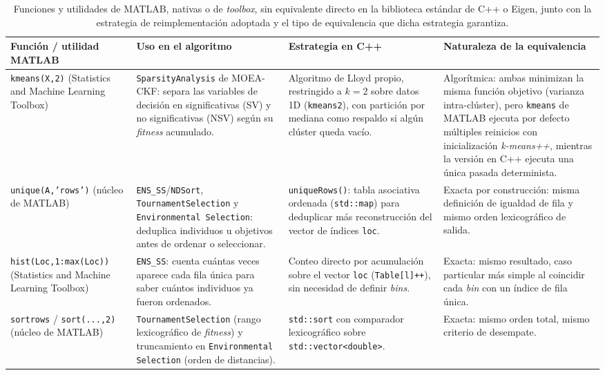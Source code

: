 \begin{table}
\centering
\footnotesize
\caption{Funciones y utilidades de MATLAB, nativas o de \textit{toolbox}, sin equivalente directo en la biblioteca estándar de C++ o Eigen, junto con la estrategia de reimplementación adoptada y el tipo de equivalencia que dicha estrategia garantiza.}
\label{tab:funciones_sin_equivalente}
\begin{tabular}{p{2.9cm}p{2.6cm}p{3.5cm}p{4cm}}
\hline
\textbf{Función / utilidad MATLAB} & \textbf{Uso en el algoritmo} & \textbf{Estrategia en C++} & \textbf{Naturaleza de la equivalencia} \\
\hline
\texttt{kmeans(X,2)} (Statistics and Machine Learning Toolbox) & \texttt{SparsityAnalysis} de MOEA-CKF: separa las variables de decisión en significativas (SV) y no significativas (NSV) según su \textit{fitness} acumulado. & Algoritmo de Lloyd propio, restringido a $k=2$ sobre datos 1D (\texttt{kmeans2}), con partición por mediana como respaldo si algún clúster queda vacío. & Algorítmica: ambas minimizan la misma función objetivo (varianza intra-clúster), pero \texttt{kmeans} de MATLAB ejecuta por defecto múltiples reinicios con inicialización \textit{k-means++}, mientras la versión en C++ ejecuta una única pasada determinista. \\
\texttt{unique(A,'rows')} (núcleo de MATLAB) & \texttt{ENS\_SS}/\texttt{NDSort}, \texttt{TournamentSelection} y \texttt{Environmental Selection}: deduplica individuos u objetivos antes de ordenar o seleccionar. & \texttt{uniqueRows()}: tabla asociativa ordenada (\texttt{std::map}) para deduplicar más reconstrucción del vector de índices \texttt{loc}. & Exacta por construcción: misma definición de igualdad de fila y mismo orden lexicográfico de salida. \\
\texttt{hist(Loc,1:max(Loc))} (Statistics and Machine Learning Toolbox) & \texttt{ENS\_SS}: cuenta cuántas veces aparece cada fila única para saber cuántos individuos ya fueron ordenados. & Conteo directo por acumulación sobre el vector \texttt{loc} (\texttt{Table[l]++}), sin necesidad de definir \textit{bins}. & Exacta: mismo resultado, caso particular más simple al coincidir cada \textit{bin} con un índice de fila única. \\
\texttt{sortrows} / \texttt{sort(...,2)} (núcleo de MATLAB) & \texttt{TournamentSelection} (rango lexicográfico de \textit{fitness}) y truncamiento en \texttt{Environmental Selection} (orden de distancias). & \texttt{std::sort} con comparador lexicográfico sobre \texttt{std::vector<double>}. & Exacta: mismo orden total, mismo criterio de desempate. \\

\end{tabular}
\end{table}
